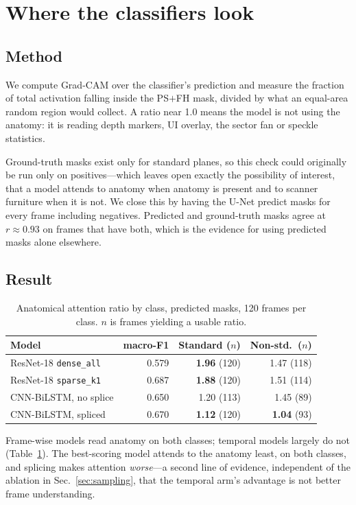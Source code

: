 \documentclass[conference]{IEEEtran}
\begin{document}
\section{Where the classifiers look}
\label{sec:attention}

\subsection{Method}

We compute Grad-CAM over the classifier's prediction and measure the fraction
of total activation falling inside the PS$+$FH mask, divided by what an
equal-area random region would collect. A ratio near 1.0 means the model is not
using the anatomy: it is reading depth markers, UI overlay, the sector fan or
speckle statistics.

Ground-truth masks exist only for standard planes, so this check could
originally be run only on positives---which leaves open exactly the possibility
of interest, that a model attends to anatomy when anatomy is present and to
scanner furniture when it is not. We close this by having the U-Net predict
masks for every frame including negatives. Predicted and ground-truth masks
agree at $r\approx0.93$ on frames that have both, which is the evidence for
using predicted masks alone elsewhere.

\subsection{Result}

\begin{table}[t]
\caption{Anatomical attention ratio by class, predicted masks, 120 frames per
class. $n$ is frames yielding a usable ratio.}
\label{tab:attention}
\centering
\begin{tabular}{lrrr}
\toprule
Model & macro-F1 & Standard ($n$) & Non-std.\ ($n$) \\
\midrule
ResNet-18 \texttt{dense\_all} & 0.579 & \textbf{1.96} (120) & 1.47 (118) \\
ResNet-18 \texttt{sparse\_k1} & 0.687 & \textbf{1.88} (120) & 1.51 (114) \\
CNN-BiLSTM, no splice & 0.650 & 1.20 (113) & 1.45 (89) \\
CNN-BiLSTM, spliced & 0.670 & \textbf{1.12} (120) & \textbf{1.04} (93) \\
\bottomrule
\end{tabular}
\end{table}

Frame-wise models read anatomy on both classes; temporal models largely do not
(Table~\ref{tab:attention}). The best-scoring model attends to the anatomy
least, on both classes, and splicing makes attention \emph{worse}---a second
line of evidence, independent of the ablation in Sec.~\ref{sec:sampling}, that
the temporal arm's advantage is not better frame understanding.
\end{document}
